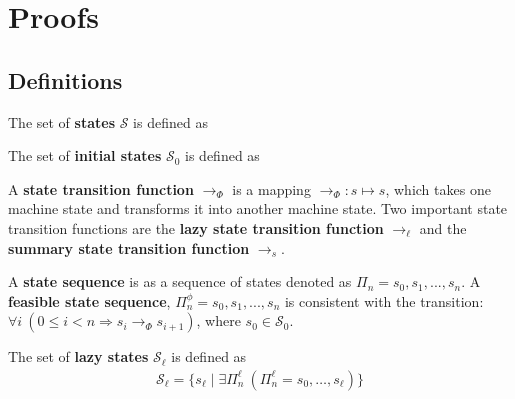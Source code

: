 \section{Proofs}

\subsection{Definitions}

\begin{definition}
The set of \textbf{states} $\mathcal{S}$ is defined as
\end{definition}

\begin{definition}
The set of \textbf{initial states} $\mathcal{S}_0$ is defined as
\end{definition}

\begin{definition}
A \textbf{state transition function} $\rightarrow_{\Phi}$ is a mapping $\rightarrow_{\Phi} : s \mapsto s$, which takes one machine state and transforms it into another machine state. Two important state transition functions are the \textbf{lazy state transition function} $\rightarrow_\ell$ and the \textbf{summary state transition function} $\rightarrow_s$.
\end{definition}

\begin{definition}
A \textbf{state sequence} is as a sequence of states denoted as $\Pi_n = s_0,s_1,...,s_n$. A \textbf{feasible state sequence}, $\Pi_n^\phi = s_0,s_1,...,s_n$ is consistent with the transition: $\forall i\ (0 \leq i < n \Rightarrow s_i \rightarrow_{\Phi} s_{i+1})$, where $s_0\in \mathcal{S}_0$.
\end{definition}

\begin{comment}
\begin{definition}
A \textbf{feasible state sequence} is defined as a sequence of states resulting from repeated application of the state transition relation to some initial state $s_0\in \mathcal{S}_0$: $$\Pi_n = s_0,s_1,...,s_n$$ where the relation $s_i \rightarrow_{\Phi} s_{i+1}$ holds for all $i \in \{ i | 0 \leq i < n \}$
\end{definition}
\end{comment}

\begin{definition}
The set of \textbf{lazy states} $\mathcal{S}_\ell$ is defined as
\begin{align}
\mathcal{S}_\ell = \{s_\ell \mid \exists \Pi_n^\ell\ (\Pi_n^\ell = s_0, \ldots, s_\ell)\}
\end{align}
\end{definition}

